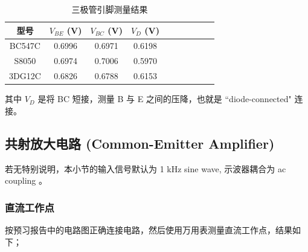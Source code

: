 \documentclass[UTF8]{article}
\begin{document}
\begin{table}[H]\centering
    \caption{三极管引脚测量结果}
    \label{三极管引脚测量结果}
\begin{tabular}{cccccccccc}\toprule
    型号 & $V_{BE}$ (V) & $V_{BC}$ (V) & $V_{D}$ (V)  \\
    \midrule
    BC547C & 0.6996 & 0.6971 & 0.6198 \\
    S8050  & 0.6974 & 0.7006 & 0.5970 \\
    3DG12C & 0.6826 & 0.6788 & 0.6153 \\
    \bottomrule
\end{tabular}
\end{table}
\noindent 其中 $V_D$ 是将 BC 短接，测量 B 与 E 之间的压降，也就是 ``diode-connected" 连接。


\subsection{共射放大电路 (Common-Emitter Amplifier)}
\vspace*{-4mm}
\begin{redbox}
若无特别说明，本小节的输入信号默认为 1 kHz sine wave, 示波器耦合为 ac coupling 。
\end{redbox}

\subsubsection{直流工作点}

按预习报告中的电路图正确连接电路，然后使用万用表测量直流工作点，结果如下；
\end{document}
